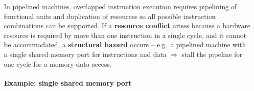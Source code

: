 \begin{definition}
In pipelined machines, overlapped instruction execution requires pipelining
of functional units and duplication of resources so all possible
instruction combinations can be supported. If a \textbf{resource conflict}
arises because a hardware resource is required by more than one instruction
in a single cycle, and it cannot be accommodated, a \textbf{structural
hazard} occurs -- e.g.\ a pipelined machine with a single shared memory port
for instructions and data $\Rightarrow$ stall the pipeline for one cycle for
a memory data access.
\end{definition}

\paragraph{Example: single shared memory port}

